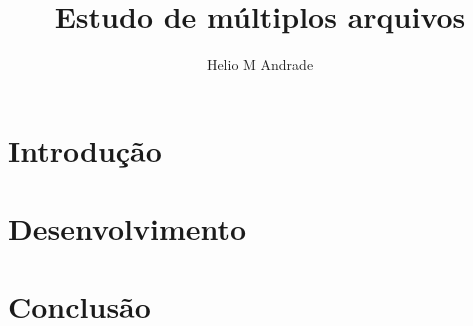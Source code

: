 \documentclass[12pt,a4paper]{article}
\author{Helio M Andrade}
\title{Estudo de múltiplos arquivos}
\begin{document}
	\maketitle
	\newpage
	
	\tableofcontents
	\newpage
	
	\section{Introdução}
	\newpage
	
	\section{Desenvolvimento}
	
	\newpage
	
	\section{Conclusão}
	
\end{document}
